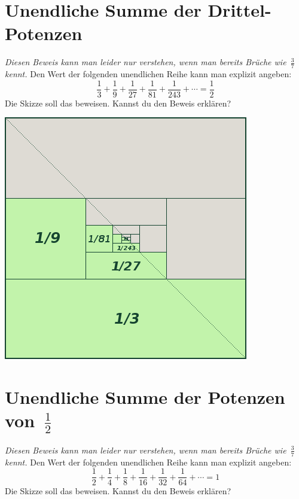 \documentclass{../../zirkelblatt}
\begin{document}
\section*{Unendliche Summe der Drittel-Potenzen}
\emph{Diesen Beweis kann man leider nur verstehen, wenn man bereits Brüche
wie~$\frac{3}{7}$ kennt.}
Den Wert der folgenden unendlichen Reihe kann man
explizit angeben:
\[ \frac{1}{3} + \frac{1}{9} + \frac{1}{27} +
\frac{1}{81} + \frac{1}{243} + \cdots = \frac{1}{2} \]
Die Skizze soll das beweisen. Kannst du den Beweis erklären?
\begin{center}
\includegraphics[scale=0.5]{geometrische-reihe-3}
\end{center}


\vfill
\section*{Unendliche Summe der Potenzen von~$\frac{1}{2}$}
\emph{Diesen Beweis kann man leider nur verstehen, wenn man bereits Brüche
wie~$\frac{3}{7}$ kennt.}
Den Wert der folgenden unendlichen Reihe kann man
explizit angeben:
\[ \frac{1}{2} + \frac{1}{4} + \frac{1}{8} +
\frac{1}{16} + \frac{1}{32} + \frac{1}{64} + \cdots = 1 \]
Die Skizze soll das beweisen. Kannst du den Beweis erklären?
\end{document}
